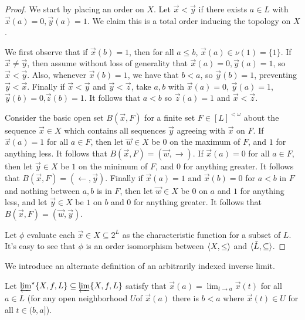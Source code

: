 \documentclass[11pt]{article}
\newcommand{\vect}{\vec}
\begin{document}
  \begin{proof}
    We start by placing an order on \(X\). Let \(\vect x<\vect y\) if
    there exists \(a\in L\) with \(\vect x(a)=0,\vect y(a)=1\). We claim this is
    a total order inducing the topology on \(X\).

    We first observe that if \(\vect x(b)=1\), then for all \(a\leq b\),
    \(\vect x(a)\in\nu(1)=\{1\}\). If \(\vect x\not=\vect y\), then assume
    without loss of generality that \(\vect x(a)=0,\vect y(a)=1\), so
    \(\vect x<\vect y\). Also, whenever \(\vect x(b)=1\), we have that \(b<a\),
    so \(\vect y(b)=1\), preventing \(\vect y<\vect x\). Finally if
    \(\vect x<\vect y\) and \(\vect y<\vect z\), take \(a,b\) with
    \(\vect x(a)=0\), \(\vect y(a)=1\),\(\vect y(b)=0\),\(\vect z(b)=1\). It
    follows that \(a<b\) so \(\vect z(a)=1\) and \(\vect x<\vect z\).

    Consider the basic open set \(B(\vect x,F)\) for a finite set
    \(F\in [L]^{<\omega}\)
    about the sequence \(\vect x\in X\) which contains all sequences
    \(\vect y\) agreeing with \(\vect x\) on \(F\). If \(\vect x(a)=1\) for all
    \(a\in F\), then let \(\vect w\in X\) be \(0\) on the maximum of \(F\),
    and \(1\) for anything less. It follows that
    \(B(\vect x,F)=(\vect w,\rightarrow)\). If \(\vect x(a)=0\) for all
    \(a\in F\), then let \(\vect y\in X\) be \(1\) on the minimum of \(F\),
    and \(0\) for anything greater. It follows that
    \(B(\vect x,F)=(\leftarrow,\vect y)\). Finally if \(\vect x(a)=1\) and
    \(\vect x(b)=0\) for \(a<b\) in \(F\) and nothing between \(a,b\) is in
    \(F\), then let \(\vect w\in X\) be \(0\) on \(a\)
    and \(1\) for anything less, and let \(\vect y\in X\) be \(1\) on \(b\)
    and \(0\) for anything greater. It follows that
    \(B(\vect x,F)=(\vect w,\vect y)\).

    Let \(\phi\) evaluate each \(\vect x\in X\subseteq 2^L\) as the
    characteristic function for a subset of \(L\). It's easy to see that
    \(\phi\) is an order isomorphism between \(\langle X,\leq\rangle\) and
    \(\langle\check L,\subseteq\rangle\).
  \end{proof}

  We introduce an alternate definition of an arbitrarily indexed
  inverse limit.

  \begin{definition}
    Let \(\varprojlim^\star\{X,f,L\}\subseteq\varprojlim\{X,f,L\}\) satisfy
    that \(\vect x(a)=\lim_{t\to a}\vect x(t)\) for all \(a\in L\)
    (for any open neighborhood
    \(U\)of \(\vect x(a)\) there is \(b<a\) where \(\vect x(t)\in U\)
    for all \(t\in(b,a]\)).
  \end{definition}
\end{document}
